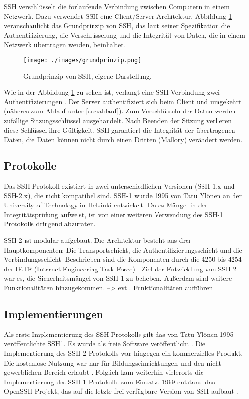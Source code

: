 \documentclass[ngerman,pdf]{wkcms}    %
\begin{document}
SSH verschlüsselt die forlaufende Verbindung zwischen Computern in einem Netzwerk. Dazu verwendet SSH eine Client/Server-Architektur. Abbildung \ref{fig:abb1} veranschaulicht das Grundprinzip von SSH, das laut seiner Spezifikation die Authentifizierung, die Verschlüsselung und die Integrität von Daten, die in einem Netzwerk übertragen werden, beinhaltet.

\begin{figure}[!h] 
\centering 
\texttt{[image: ./images/grundprinzip.png]}
\label{fig:abb1} 
\caption[Abbildung 1]{Grundprinzip von SSH, eigene Darstellung.} 
\end{figure}
 
Wie in der Abbildung \ref{fig:abb1} zu sehen ist, verlangt eine SSH-Verbindung zwei Authentifizierungen \cite[S. 47]{SSH}. Der Server authentifiziert sich beim Client und umgekehrt (näheres zum Ablauf unter \ref{sec:ablauf}). Zum Verschlüsseln der Daten werden zufällige Sitzungsschlüssel ausgehandelt. Nach Beenden der Sitzung verlieren diese Schlüssel ihre Gültigkeit. SSH garantiert die Integrität der übertragenen Daten, \Dh die Daten können nicht durch einen Dritten (Mallory) verändert werden. 


\subsection{Protokolle}

Das SSH-Protokoll existiert in zwei unterschiedlichen Versionen (SSH-1.x und SSH-2.x), die nicht kompatibel sind. SSH-1 wurde 1995 von Tatu Ylönen an der University of Technology in Helsinki entwickelt. Da es Mängel in der Integritätsprüfung aufweist, ist von einer weiteren Verwendung des SSH-1 Protokolls dringend abzuraten.

SSH-2 ist modular aufgebaut. Die Architektur besteht aus drei Hauptkomponenten: Die Transportschicht, die Authentifizierungsschicht und die Verbindungsschicht. Beschrieben sind die Komponenten durch die  4250 bis 4254 der IETF (Internet Engineering Task Force) \cite{ietf}. Ziel der Entwicklung von SSH-2 war es, die Sicherheitsmängel von SSH-1 zu beheben. Außerdem sind weitere Funktionalitäten hinzugekommen. --> evtl. Funktionalitäten aufführen


\subsection{Implementierungen}

Als erste Implementierung des SSH-Protokolls gilt das von Tatu Ylönen 1995 veröffentlichte SSH1.
Es wurde als freie Software veröffentlicht \cite[S. 11]{SSH}. Die Implementierung des SSH-2-Protokolls war hingegen ein kommerzielles Produkt. Die kostenlose Nutzung war nur für Bildungseinrichtungen und den nicht-gewerblichen Bereich erlaubt \cite[S. 22]{SSH}. Folglich kam weiterhin vielerorts die Implementierung des SSH-1-Protokolls zum Einsatz. 1999 entstand das OpenSSH-Projekt, das auf die letzte frei verfügbare Version von SSH aufbaut \cite{OpenSSH}.
\end{document}
